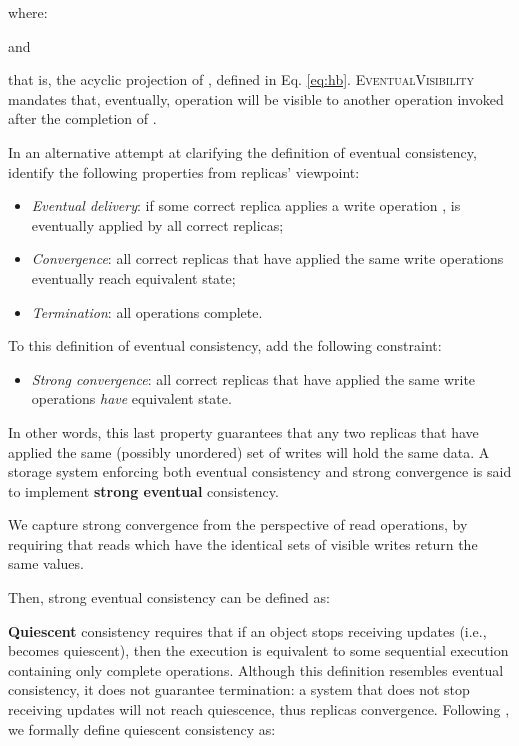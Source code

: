 \documentclass[letter, 11pt]{article}
\newcommand{\citeN}{\citet}
\renewcommand{\cite}{\citep}
\begin{document}
where:

and

that is, the acyclic projection of , defined in Eq. \ref{eq:hb}.
\textsc{EventualVisibility} mandates that, eventually, operation  will be visible to another operation   invoked after the completion of .

In an alternative attempt at clarifying the definition of eventual consistency, 
\citeN{Shapiro.ea:11} identify the following properties from replicas' viewpoint:
\begin{itemize}
\item \emph{Eventual delivery}: if some correct replica applies a write operation ,  is eventually applied by all correct replicas;
\item \emph{Convergence}:
all correct replicas that have applied the same write operations eventually reach equivalent state;
\item \emph{Termination}: 
all operations complete. \end{itemize}
To this definition of eventual consistency, \citeN{Shapiro.ea:11} add the following constraint:
\begin{itemize}
\item \emph{Strong convergence}:
all correct replicas that have applied the same write operations \emph{have} equivalent state.
\end{itemize}
In other words, this last property guarantees that any two replicas that have applied the same (possibly unordered) set of writes will hold the same data. A storage system enforcing both eventual consistency and strong convergence is said to implement \textbf{strong eventual} consistency.

We capture strong convergence from the perspective of read operations, by requiring that reads which have the identical sets of visible writes return the same values. 

Then, strong eventual consistency can be defined as:



\textbf{Quiescent} consistency \cite{Herlihy.Shavit:08} requires that 
if an object stops receiving updates (i.e., becomes quiescent), 
then the execution is equivalent to some sequential execution containing only complete operations.
Although this definition resembles eventual consistency, 
it does not guarantee termination: 
a system that does not stop receiving updates will not reach quiescence, thus replicas convergence.
Following \cite{Burckhardt:14}, we formally define quiescent consistency as:
\end{document}
